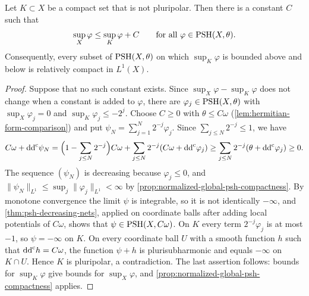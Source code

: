 \begin{corollary}\label{cor:nonpluripolar-normalization}
Let $K\subset X$ be a compact set that is not pluripolar. Then there is a constant $C$ such that
\[
 \sup_X\varphi\leq\sup_K\varphi+C\qquad\text{for all }\varphi\in\mathrm{PSH}(X,\theta).
\]
Consequently, every subset of $\mathrm{PSH}(X,\theta)$ on which $\sup_K\varphi$ is bounded above and below is relatively compact in $L^1(X)$.
\end{corollary}
\begin{proof}
Suppose that no such constant exists. Since $\sup_X\varphi-\sup_K\varphi$ does not change when a constant is added to $\varphi$, there are $\varphi_j\in\mathrm{PSH}(X,\theta)$ with $\sup_X\varphi_j=0$ and $\sup_K\varphi_j\leq-2^j$. Choose $C\geq0$ with $\theta\leq C\omega$ (\cref{lem:hermitian-form-comparison}) and put $\psi_N=\sum_{j=1}^N2^{-j}\varphi_j$. Since $\sum_{j\leq N}2^{-j}\leq1$, we have
\[
 C\omega+\mathrm{dd}^{\mathrm{c}}\psi_N=\Bigl(1-\sum_{j\leq N}2^{-j}\Bigr)C\omega+\sum_{j\leq N}2^{-j}(C\omega+\mathrm{dd}^{\mathrm{c}}\varphi_j)\geq\sum_{j\leq N}2^{-j}(\theta+\mathrm{dd}^{\mathrm{c}}\varphi_j)\geq0.
\]
The sequence $(\psi_N)$ is decreasing because $\varphi_j\leq0$, and $\|\psi_N\|_{L^1}\leq\sup_j\|\varphi_j\|_{L^1}<\infty$ by \cref{prop:normalized-global-psh-compactness}. By monotone convergence the limit $\psi$ is integrable, so it is not identically $-\infty$, and \cref{thm:psh-decreasing-nets}, applied on coordinate balls after adding local potentials of $C\omega$, shows that $\psi\in\mathrm{PSH}(X,C\omega)$. On $K$ every term $2^{-j}\varphi_j$ is at most $-1$, so $\psi=-\infty$ on $K$. On every coordinate ball $U$ with a smooth function $h$ such that $\mathrm{dd}^{\mathrm{c}} h=C\omega$, the function $\psi+h$ is plurisubharmonic and equals $-\infty$ on $K\cap U$. Hence $K$ is pluripolar, a contradiction. The last assertion follows: bounds for $\sup_K\varphi$ give bounds for $\sup_X\varphi$, and \cref{prop:normalized-global-psh-compactness} applies.
\end{proof}

